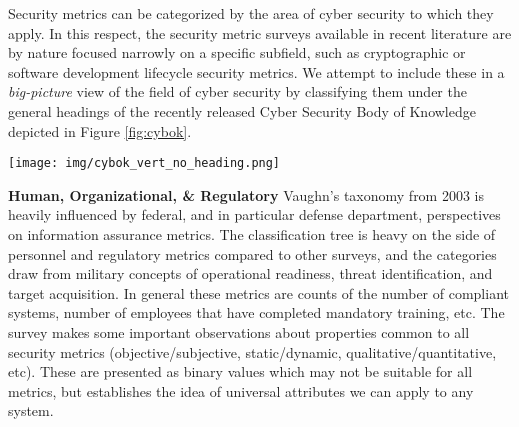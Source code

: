 






Security metrics can be categorized by the area of cyber security to which they apply. In this respect, the security metric surveys available in recent literature are by nature focused narrowly on a specific subfield, such as cryptographic or software development lifecycle security metrics. We attempt to include these in a \textit{big-picture} view of the field of cyber security by classifying them under the general headings of the recently released Cyber Security Body of Knowledge\cite{Rashid_Chivers_Danezis_Lupu_Martin} depicted in Figure \ref{fig:cybok}. 


\begin{figure*}[ht]
\centering
\texttt{[image: img/cybok\_vert\_no\_heading.png]}
\caption{Cyber Security Body of Knowledge - Key Areas}
\label{fig:cybok}
\end{figure*} 

\textbf{Human, Organizational, \& Regulatory} Vaughn’s taxonomy\cite{Vaughn_Henning_Siraj_2003} from 2003 is heavily influenced by federal, and in particular defense department, perspectives on information assurance metrics. The classification tree is heavy on the side of personnel and regulatory metrics compared to other surveys, and the categories draw from military concepts of operational readiness, threat identification, and target acquisition. In general these metrics are counts of the number of compliant systems, number of employees that have completed mandatory training, etc. The survey makes some important observations about properties common to all security metrics (objective/subjective, static/dynamic, qualitative/quantitative, etc). These are presented as binary values which may not be suitable for all metrics, but establishes the idea of universal attributes we can apply to any system.

